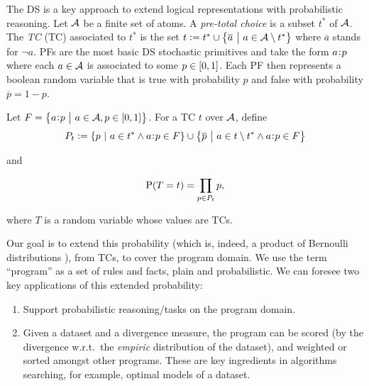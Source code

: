\documentclass{llncs}
\newcommand{\at}[1]{\ensuremath{\!\del{#1}}}
\newcommand{\co}[1]{\ensuremath{\overline{#1}}}
\newcommand{\fml}[1]{\ensuremath{{\cal #1}}}
\newcommand{\pr}[1]{\ensuremath{\mathrm{P}\at{#1}}}
\newcommand{\given}{\ensuremath{~\middle|~}}
\newcommand{\probfact}[2]{\ensuremath{#2\mkern-4mu:\mkern-4mu#1}}
\renewcommand{\note}[1]{
    \stepcounter{remark}%
    {\!\!\color{red}/}\footnotemark[\arabic{remark}]\!\!%
    \footnotetext[\arabic{remark}]{{\color{red}/}#1}
}
\begin{document}
The \ac{DS} \cite{sato1995statistical,riguzzi2022foundations} is a key approach to extend logical representations with probabilistic reasoning. 
%
Let $\fml{A}$ be a finite set of atoms. A \emph{pre-total choice} is a subset $t^{\ast}$ of \fml{A}. The \emph{\acl{TC}} (TC) associated to $t^{\ast}$ is the set $t := t^{\ast} \cup \set{\co{a} \given a \in \fml{A} \setminus t^{\ast}}$ where $\co{a}$ stands for $\neg a$. \Acp{PF} are the most basic \ac{DS} stochastic primitives and take the form  $\probfact{p}{a}$ where each $a\in\fml{A}$ is associated to some $p\in\intcc{0, 1}$. Each \ac{PF} then represents a boolean random variable that is true with probability $p$ and false with probability $\co{p} = 1 - p$.

Let $F = \set{\probfact{p}{a} \given a \in \fml{A}, p \in \intcc{0, 1}}$. For a \acl{TC} $t$ over $\fml{A}$, define
$$
P_t := \set{ p \given a \in t^{\ast} \wedge \probfact{p}{a} \in F} \cup 
    \set{\co{p} \given a \in t \setminus t^{\ast} \wedge \probfact{p}{a} \in F}
$$

and

\begin{equation}
    \pr{T = t} = \prod_{p \in P_t} p,
    \label{eq:prob.total.choice}
\end{equation}

where $T$ is a random variable whose values are \aclp{TC}.

Our goal is to extend this probability (which is, indeed, a product of Bernoulli distributions \cite{Teugels90}), from \aclp{TC}, to cover the program domain. We use the term ``program'' as a set of rules and facts, plain and probabilistic. We can foresee two key applications of this extended probability:

\begin{enumerate}
    \item Support probabilistic reasoning/tasks on the program domain.
    \item Given a dataset and a divergence measure, the program can be scored (by the divergence w.r.t.\ the \emph{empiric} distribution of the dataset), and weighted or sorted amongst other programs. These are key ingredients in algorithms searching, for example, optimal models of a dataset.
\end{enumerate}
\end{document}
